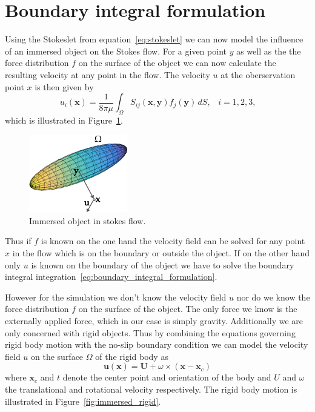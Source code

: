 \documentclass[a4paper,11pt]{kth-mag}
\begin{document}
\section{Boundary integral formulation}

Using the Stokeslet from equation~\eqref{eq:stokeslet} we can now model the influence of an immersed object on the Stokes flow. For a given point $y$ as well as the the force distribution $f$ on the surface of the object we can now calculate the resulting velocity at any point in the flow. The velocity $u$ at the oberservation point $x$ is then given by
\begin{equation}
  \label{eq:boundary_integral_formulation}
  u_i(\mathbf{x}) = \frac{1}{8\pi\mu}\int_{\Omega}S_{ij}(\mathbf{x},\mathbf{y})f_j(\mathbf{y}) \, dS \text{,} \quad i=1,2,3\text{,}
\end{equation}
which is illustrated in Figure~\ref{fig:immersed}.

\begin{figure}[!htbp]
  \centering
  \includegraphics[width=0.3819660112501450000000\textwidth]{img/immersed.pdf}
  \caption{Immersed object in stokes flow.}
  \label{fig:immersed}
\end{figure}

Thus if $f$ is known on the one hand the velocity field can be solved for any point $x$ in the flow which is on the boundary or outside the object. If on the other hand only $u$ is known on the boundary of the object we have to solve the boundary integral integration~\eqref{eq:boundary_integral_formulation}.

However for the simulation we don't know the velocity field $u$ nor do we know the force distribution $f$ on the surface of the object. The only force we know is the externally applied force, which in our case is simply gravity. Additionally we are only concerned with rigid objects. Thus by combining the equations governing rigid body motion with the no-slip boundary condition we can model the velocity field $u$ on the surface $\Omega$ of the rigid body as
\begin{equation}
  \label{eq:rigid_body_motion}
  \mathbf{u}(\mathbf{x}) = \mathbf{U} + \omega \times (\mathbf{x} - \mathbf{x}_c)
\end{equation}
where $\mathbf{x}_c$ and $t$ denote the center point and orientation of the body and $U$ and $\omega$ the translational and rotational velocity respectively. The rigid body motion is illustrated in Figure~\ref{fig:immersed_rigid}.
\end{document}
